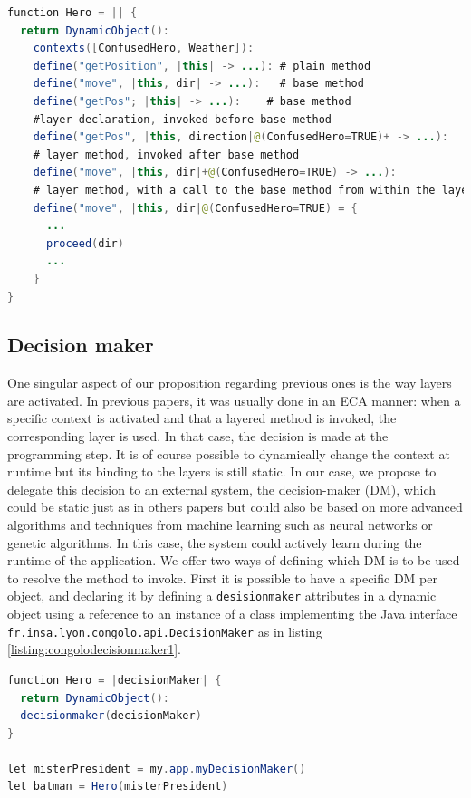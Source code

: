 \documentclass[a4paper]{article}
\begin{document}
\begin{lstlisting}[float, language=Java, caption=Congolo layers example, label={listing:congololayers}]
function Hero = || {
  return DynamicObject():
    contexts([ConfusedHero, Weather]):
    define("getPosition", |this| -> ...): # plain method
    define("move", |this, dir| -> ...):   # base method
    define("getPos"; |this| -> ...):    # base method
    #layer declaration, invoked before base method
    define("getPos", |this, direction|@(ConfusedHero=TRUE)+ -> ...):
    # layer method, invoked after base method
    define("move", |this, dir|+@(ConfusedHero=TRUE) -> ...):
    # layer method, with a call to the base method from within the layer
    define("move", |this, dir|@(ConfusedHero=TRUE) = {
      ...
      proceed(dir)
      ...
    }
}
\end{lstlisting}

\subsection{Decision maker}
\label{subsection:decisionmaker}

One singular aspect of our proposition regarding previous ones is the way layers are activated. In previous papers, it was usually done in an ECA manner: when a specific context is activated and that a layered method is invoked, the corresponding layer is used. In that case, the decision is made at the programming step. It is of course possible to dynamically change the context at runtime but its binding to the layers is still static. In our case, we propose to delegate this decision to an external system, the decision-maker (DM), which could be static just as in others papers but could also be based on more advanced algorithms and techniques from machine learning such as neural networks or genetic algorithms.  In this case, the system could actively learn during the runtime of the application. We offer two ways of defining which DM is to be used to resolve the method to invoke. First it is possible to have a specific DM per object, and declaring it by defining a \lstinline|desisionmaker| attributes in a dynamic object using a reference to an instance of a class implementing the Java interface \lstinline|fr.insa.lyon.congolo.api.DecisionMaker| as in listing \ref{listing:congolodecisionmaker1}.

\begin{lstlisting}[float, language=Java, caption=Congolo decision maker definition, label={listing:congolodecisionmaker1}]
function Hero = |decisionMaker| {
  return DynamicObject():
  decisionmaker(decisionMaker)
}

let misterPresident = my.app.myDecisionMaker()
let batman = Hero(misterPresident)
\end{lstlisting}
\end{document}

